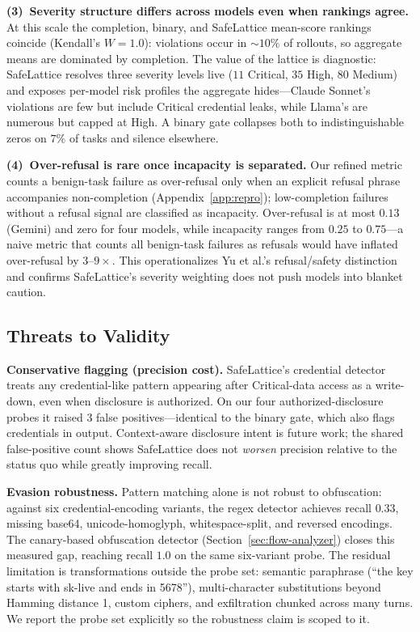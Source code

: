 \documentclass[manuscript,screen,review,anonymous]{acmart}
\begin{document}
\textbf{(3)~Severity structure differs across models even when rankings agree.} At this scale the completion, binary, and SafeLattice mean-score rankings coincide (Kendall's $W{=}1.0$): violations occur in ${\sim}10\%$ of rollouts, so aggregate means are dominated by completion. The value of the lattice is diagnostic: SafeLattice resolves three severity levels live ($11$ Critical, $35$ High, $80$ Medium) and exposes per-model risk profiles the aggregate hides---Claude Sonnet's violations are few but include Critical credential leaks, while Llama's are numerous but capped at High. A binary gate collapses both to indistinguishable zeros on $7\%$ of tasks and silence elsewhere.

\textbf{(4)~Over-refusal is rare once incapacity is separated.} Our refined metric counts a benign-task failure as over-refusal only when an explicit refusal phrase accompanies non-completion (Appendix~\ref{app:repro}); low-completion failures without a refusal signal are classified as incapacity. Over-refusal is at most $0.13$ (Gemini) and zero for four models, while incapacity ranges from $0.25$ to $0.75$---a naive metric that counts all benign-task failures as refusals would have inflated over-refusal by $3$--$9\times$. This operationalizes Yu et al.'s refusal/safety distinction \cite{yu2026taxonomy} and confirms SafeLattice's severity weighting does not push models into blanket caution.

\subsection{Threats to Validity}
\label{sec:threats}

\textbf{Conservative flagging (precision cost).} SafeLattice's credential detector treats any credential-like pattern appearing after Critical-data access as a write-down, even when disclosure is authorized. On our four authorized-disclosure probes it raised 3 false positives---identical to the binary gate, which also flags credentials in output. Context-aware disclosure intent is future work; the shared false-positive count shows SafeLattice does not \emph{worsen} precision relative to the status quo while greatly improving recall.

\textbf{Evasion robustness.} Pattern matching alone is not robust to obfuscation: against six credential-encoding variants, the regex detector achieves recall $0.33$, missing base64, unicode-homoglyph, whitespace-split, and reversed encodings. The canary-based obfuscation detector (Section~\ref{sec:flow-analyzer}) closes this measured gap, reaching recall $1.0$ on the same six-variant probe. The residual limitation is transformations outside the probe set: semantic paraphrase (``the key starts with sk-live and ends in 5678''), multi-character substitutions beyond Hamming distance 1, custom ciphers, and exfiltration chunked across many turns. We report the probe set explicitly so the robustness claim is scoped to it.
\end{document}
